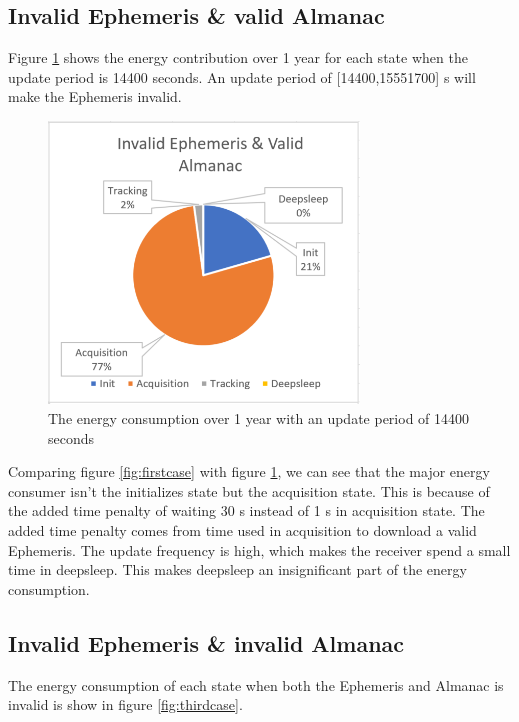 \subsection{Invalid Ephemeris \& valid Almanac}
Figure \ref{fig:secondcase} shows the energy contribution over 1 year for each state when the update period is 14400 seconds. An update period of [14400,15551700] s will make the Ephemeris invalid.

\begin{figure}[H]
\centering
\includegraphics[height=7.5cm]{Project_Report/Images/invalidvalid.PNG}
\caption{The energy consumption over 1 year with an update period of 14400 seconds}
\label{fig:secondcase}
\end{figure}

Comparing figure \ref{fig:firstcase} with figure \ref{fig:secondcase}, we can see that the major energy consumer isn't the initializes state but the acquisition state. This is because of the added time penalty of waiting 30 s instead of 1 s in acquisition state. The added time penalty comes from time used in acquisition to download a valid Ephemeris. The update frequency is high, which makes the receiver spend a small time in deepsleep. This makes deepsleep an insignificant part of the energy consumption.  

\subsection{Invalid Ephemeris \& invalid Almanac}

The energy consumption of each state when both the Ephemeris and Almanac is invalid is show in figure \ref{fig:thirdcase}.

